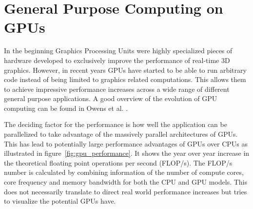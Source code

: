 \documentclass[a4paper,11pt]{kth-mag}
\begin{document}
\section{General Purpose Computing on GPUs}
In the beginning Graphics Processing Units were highly specialized pieces of hardware developed to exclusively improve the performance of real-time 3D graphics. However, in recent years GPUs have started to be able to run arbitrary code instead of being limited to graphics related computations. This allows them to achieve impressive performance increases across a wide range of different general purpose applications. A good overview of the evolution of GPU computing can be found in Owens et al. \cite{Owens2008}. 

The deciding factor for the performance is how well the application can be parallelized to take advantage of the massively parallel architectures of GPUs. This has lead to potentially large performance advantages of GPUs over CPUs as illustrated in figure~\ref{fig:gpu_performance}. It shows the year over year increase in the theoretical floating point operations per second (FLOP/s). The FLOP/s number is calculated by combining information of the number of compute cores, core frequency and memory bandwidth for both the CPU and GPU models. This does not necessarily translate to direct real world performance increases but tries to visualize the potential GPUs have.
\end{document}
